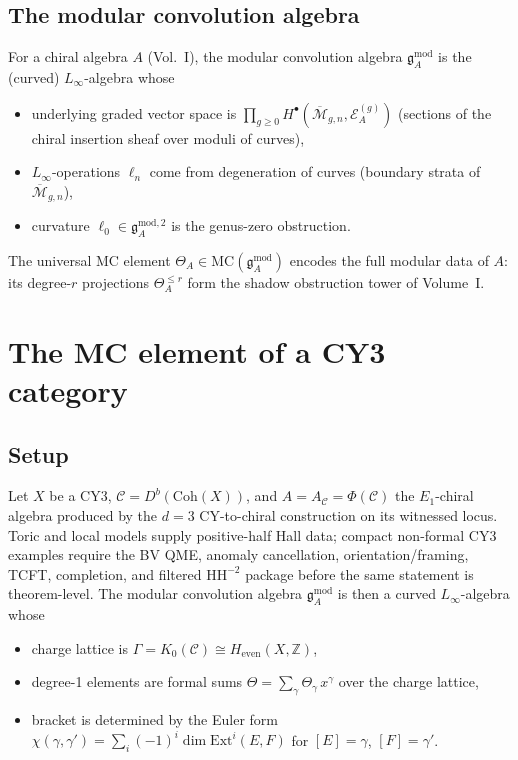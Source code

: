 \documentclass[11pt]{article}
\theoremstyle{definition}
\theoremstyle{remark}
\newcommand{\frakg}{\mathfrak{g}}
\newcommand{\Linf}{L_\infty}
\newcommand{\MC}{\mathrm{MC}}
\newcommand{\HH}{\mathrm{HH}}
\newcommand{\Coh}{\mathrm{Coh}}
\newcommand{\cC}{\mathcal{C}}
\newcommand{\cM}{\mathcal{M}}
\newcommand{\cE}{\mathcal{E}}
\begin{document}
\subsection{The modular convolution algebra}
\label{ssec:modular-conv}

For a chiral algebra $A$ (Vol.~I), the modular convolution algebra
$\frakg^{\mathrm{mod}}_A$ is the (curved) $\Linf$-algebra whose
\begin{itemize}
\item underlying graded vector space is
 $\prod_{g \geq 0} H^\bullet(\overline{\cM}_{g,n}, \cE^{(g)}_A)$
 (sections of the chiral insertion sheaf over moduli of curves),
\item $\Linf$-operations $\ell_n$ come from degeneration of curves
 (boundary strata of $\overline{\cM}_{g,n}$),
\item curvature $\ell_0 \in \frakg^{\mathrm{mod},2}_A$ is the genus-zero
 obstruction.
\end{itemize}
The universal MC element $\Theta_A \in \MC(\frakg^{\mathrm{mod}}_A)$ encodes
the full modular data of $A$: its degree-$r$ projections
$\Theta^{\leq r}_A$ form the shadow obstruction tower of Volume~I.

\section{The MC element of a CY3 category}
\label{sec:wc-mc-cy3}

\subsection{Setup}
\label{ssec:cy3-setup}

Let $X$ be a CY3, $\cC = D^b(\Coh(X))$, and $A = A_\cC = \Phi(\cC)$ the
$E_1$-chiral algebra produced by the $d=3$ CY-to-chiral construction on
its witnessed locus. Toric and local models supply positive-half Hall
data; compact non-formal CY3 examples require the BV QME, anomaly
cancellation, orientation/framing, TCFT, completion, and filtered
$\HH^{-2}$ package before the same statement is theorem-level.
The modular convolution algebra $\frakg^{\mathrm{mod}}_A$ is then a curved
$\Linf$-algebra whose
\begin{itemize}
\item charge lattice is $\Gamma = K_0(\cC) \cong H_{\mathrm{even}}(X,
 \mathbb{Z})$,
\item degree-1 elements are formal sums $\Theta = \sum_\gamma
 \Theta_\gamma \, x^\gamma$ over the charge lattice,
\item bracket is determined by the Euler form
 $\chi(\gamma, \gamma') = \sum_i (-1)^i \dim \mathrm{Ext}^i(E, F)$
 for $[E] = \gamma$, $[F] = \gamma'$.
\end{itemize}
\end{document}
